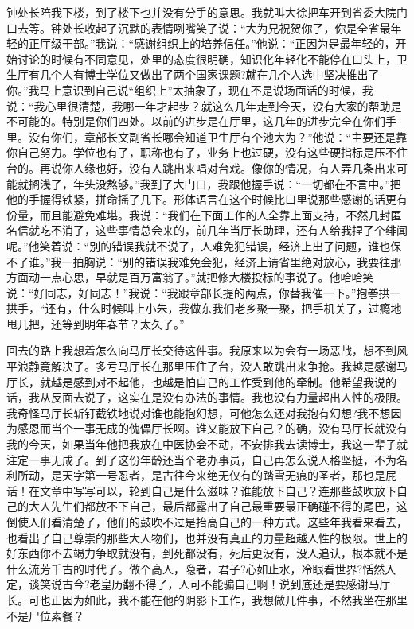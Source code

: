\documentclass[12pt,oneside]{book}
\begin{document}
钟处长陪我下楼，到了楼下也并没有分手的意思。我就叫大徐把车开到省委大院门口去等。钟处长收起了沉默的表情咧嘴笑了说：``大为兄祝贺你了，你是全省最年轻的正厅级干部。''我说：``感谢组织上的培养信任。''他说：``正因为是最年轻的，开始讨论的时候有不同意见，处里的态度很明确，知识化年轻化不能停在口头上，卫生厅有几个人有博士学位又做出了两个国家课题?就在几个人选中坚决推出了你。''我马上意识到自己说``组织上''太抽象了，现在不是说场面话的时候，我说：``我心里很清楚，我哪一年才起步？就这么几年走到今天，没有大家的帮助是不可能的。特别是你们四处。以前的进步是在厅里，这几年的进步完全在你们手里。没有你们，章部长文副省长哪会知道卫生厅有个池大为？''他说：``主要还是靠你自己努力。学位也有了，职称也有了，业务上也过硬，没有这些硬指标是压不住台的。再说你人缘也好，没有人跳出来唱对台戏。像你的情况，有人弄几条出来可能就搁浅了，年头没熬够。''我到了大门口，我跟他握手说：``一切都在不言中。''把他的手握得铁紧，拼命摇了几下。形体语言在这个时候比口里说那些感谢的话更有份量，而且能避免难堪。我说：``我们在下面工作的人全靠上面支持，不然几封匿名信就吃不消了，这些事情总会来的，前几年当厅长助理，还有人给我捏了个绯闻呢。''他笑着说：``别的错误我就不说了，人难免犯错误，经济上出了问题，谁也保不了谁。''我一拍胸说：``别的错误我难免会犯，经济上请省里绝对放心，我要往那方面动一点心思，早就是百万富翁了。''就把修大楼投标的事说了。他哈哈笑说：``好同志，好同志！''我说：``我跟章部长提的两点，你替我催一下。''抱拳拱一拱手，``还有，什么时候叫上小朱，我做东我们老乡聚一聚，把手机关了，过瘾地甩几把，还等到明年春节？太久了。''

回去的路上我想着怎么向马厅长交待这件事。我原来以为会有一场恶战，想不到风平浪静竟解决了。多亏马厅长在那里压住了台，没人敢跳出来争抢。我越是感谢马厅长，就越是感到对不起他，也越是怕自己的工作受到他的牵制。他希望我说的话，我从反面去说了，这实在是没有办法的事情。我也没有力量超出人性的极限。我奇怪马厅长斩钉截铁地说对谁也能抱幻想，可他怎么还对我抱有幻想?我不想因为感恩而当个一事无成的傀儡厅长啊。谁又能放下自己？的确，没有马厅长就没有我的今天，如果当年他把我放在中医协会不动，不安排我去读博士，我这一辈子就注定一事无成了。到了这份年龄还当个老办事员，自己再怎么说人格坚挺，不为名利所动，是天字第一号忍者，是古往今来绝无仅有的踏雪无痕的圣者，那也是屁话！在文章中写写可以，轮到自己是什么滋味？谁能放下自己？连那些鼓吹放下自己的大人先生们都放不下自己，最后都露出了自己最重要最正确碰不得的尾巴，这倒使人们看清楚了，他们的鼓吹不过是抬高自己的一种方式。这些年我看来看去，也看出了自己尊崇的那些大人物们，也并没有真正的力量超越人性的极限。世上的好东西你不去竭力争取就没有，到死都没有，死后更没有，没人追认，根本就不是什么流芳千古的时代了。做个高人，隐者，君子?心如止水，冷眼看世界?恬然入定，谈笑说古今?老皇历翻不得了，人可不能骗自己啊！说到底还是要感谢马厅长。可也正因为如此，我不能在他的阴影下工作，我想做几件事，不然我坐在那里不是尸位素餐？
\end{document}
